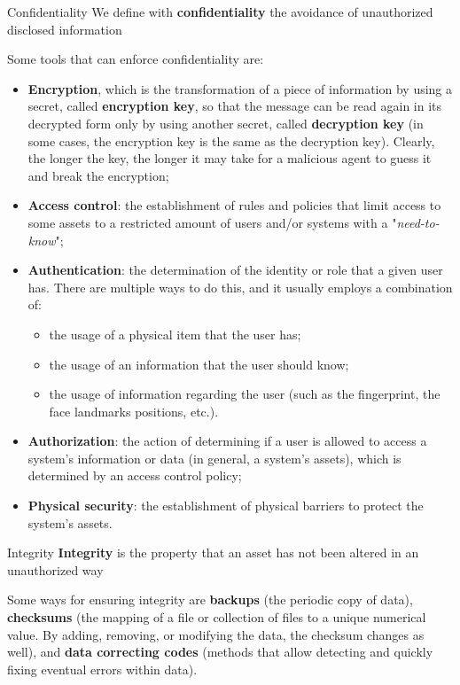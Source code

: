 \begin{definition}{Confidentiality}
    We define with \textbf{confidentiality} the avoidance of unauthorized disclosed information
\end{definition}

Some tools that can enforce confidentiality are:
\begin{itemize}
    \item \textbf{Encryption}, which is the transformation of a piece of information by using a secret, called \textbf{encryption key}, so that the message can be read again in its decrypted form only by using another secret, called \textbf{decryption key} (in some cases, the encryption key is the same as the decryption key). Clearly, the longer the key, the longer it may take for a malicious agent to guess it and break the encryption;
    \item \textbf{Access control}: the establishment of rules and policies that limit access to some assets to a restricted amount of users and/or systems with a "\textit{need-to-know}";
    \item \textbf{Authentication}: the determination of the identity or role that a given user has. There are multiple ways to do this, and it usually employs a combination of:
    \begin{itemize}
        \item the usage of a physical item that the user has;
        \item the usage of an information that the user should know;
        \item the usage of information regarding the user (such as the fingerprint, the face landmarks positions, etc.).
    \end{itemize}
    \item \textbf{Authorization}: the action of determining if a user is allowed to access a system's information or data (in general, a system's assets), which is determined by an access control policy;
    \item \textbf{Physical security}: the establishment of physical barriers to protect the system's assets.
\end{itemize}

\begin{definition}{Integrity}
    \textbf{Integrity} is the property that an asset has not been altered in an unauthorized way
\end{definition}

Some ways for ensuring integrity are \textbf{backups} (the periodic copy of data), \textbf{checksums} (the mapping of a file or collection of files to a unique numerical value. By adding, removing, or modifying the data, the checksum changes as well), and \textbf{data correcting codes} (methods that allow detecting and quickly fixing eventual errors within data).


